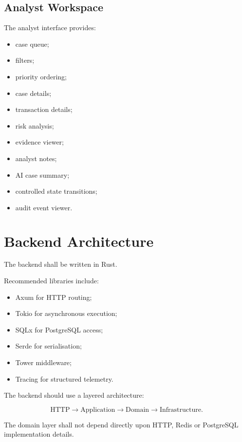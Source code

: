\documentclass[11pt,a4paper]{article}
\begin{document}
\subsection{Analyst Workspace}

The analyst interface provides:

\begin{itemize}
    \item case queue;
    \item filters;
    \item priority ordering;
    \item case details;
    \item transaction details;
    \item risk analysis;
    \item evidence viewer;
    \item analyst notes;
    \item AI case summary;
    \item controlled state transitions;
    \item audit event viewer.
\end{itemize}

\section{Backend Architecture}

The backend shall be written in Rust.

Recommended libraries include:

\begin{itemize}
    \item Axum for HTTP routing;
    \item Tokio for asynchronous execution;
    \item SQLx for PostgreSQL access;
    \item Serde for serialisation;
    \item Tower middleware;
    \item Tracing for structured telemetry.
\end{itemize}

The backend should use a layered architecture:

\[
\text{HTTP}
\rightarrow
\text{Application}
\rightarrow
\text{Domain}
\rightarrow
\text{Infrastructure}.
\]

The domain layer shall not depend directly upon HTTP, Redis or
PostgreSQL implementation details.
\end{document}
